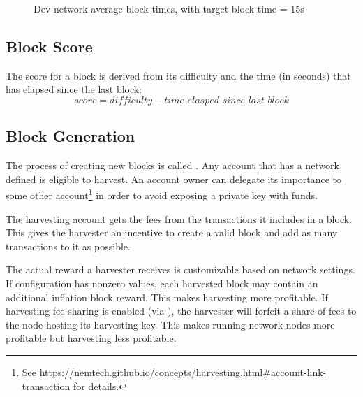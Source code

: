 \begin{figure}
	\caption{Dev network average block times, with target block time = 15s}
\end{figure}

\subsection{Block Score}

The score for a block is derived from its difficulty and the time (in seconds) that has elapsed since the last block:
\begin{equation}
\tag{block score} \mathit{score} = \mathit{difficulty} - \textit{time elasped since last block}
\end{equation}

\subsection{Block Generation} \label{sec:blockGeneration}

The process of creating new blocks is called .
Any account that has a network defined  is eligible to harvest.
An account owner can delegate its importance to some other account\footnote{See \url{https://nemtech.github.io/concepts/harvesting.html\#account-link-transaction} for details.} in order to avoid exposing a private key with funds.

The harvesting account gets the fees from the transactions it includes in a block.
This gives the harvester an incentive to create a valid block and add as many transactions to it as possible.

The actual reward a harvester receives is customizable based on network settings.
If  configuration has nonzero values, each harvested block may contain an additional inflation block reward.
This makes harvesting more profitable.
If harvesting fee sharing is enabled (via ), the harvester will forfeit a share of fees to the node hosting its harvesting key.
This makes running network nodes more profitable but harvesting less profitable.

